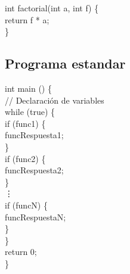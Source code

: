 \documentclass[a4paper, 12pt]{article}
\begin{document}
int factorial(int a, int f) \{ \\
return f * a;\\
\}

\subsection{Programa estandar}
int main () \{ \\
// Declaración de variables\\
while (true) \{ \\
if (func1) \{ \\
funcRespuesta1;\\
\} \\
if (func2) \{ \\
funcRespuesta2;\\
\} \\
\vdots\\
if (funcN) \{ \\
funcRespuestaN;\\
\} \\
\} \\
return 0;\\
\}
\end{document}
